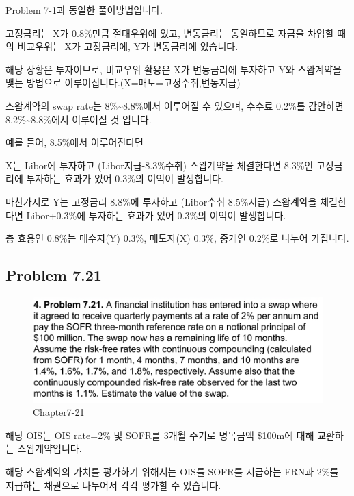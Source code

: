 \documentclass[
  letterpaper,
  DIV=11,
  numbers=noendperiod]{scrreprt}
\begin{document}
Problem 7-1과 동일한 풀이방법입니다.

고정금리는 X가 0.8\%만큼 절대우위에 있고, 변동금리는 동일하므로 자금을
차입할 때의 비교우위는 X가 고정금리에, Y가 변동금리에 있습니다.

해당 상황은 투자이므로, 비교우위 활용은 X가 변동금리에 투자하고 Y와
스왑계약을 맺는 방법으로 이루어집니다.(X=매도=고정수취,변동지급)

스왑계약의 swap rate는 8\%\textasciitilde8.8\%에서 이루어질 수 있으며,
수수료 0.2\%를 감안하면 8.2\%\textasciitilde8.8\%에서 이루어질 것
입니다.

예를 들어, 8.5\%에서 이루어진다면

X는 Libor에 투자하고 (Libor지급-8.3\%수취) 스왑계약을 체결한다면 8.3\%인
고정금리에 투자하는 효과가 있어 0.3\%의 이익이 발생합니다.

마찬가지로 Y는 고정금리 8.8\%에 투자하고 (Libor수취-8.5\%지급)
스왑계약을 체결한다면 Libor+0.3\%에 투자하는 효과가 있어 0.3\%의 이익이
발생합니다.

총 효용인 0.8\%는 매수자(Y) 0.3\%, 매도자(X) 0.3\%, 중개인 0.2\%로
나누어 가집니다.

\subsection*{\texorpdfstring{\textbf{Problem
7.21}}{Problem 7.21}}\label{problem-7.21}

\begin{figure}[H]

{\centering \includegraphics{images/선물옵션_7-21.png}

}

\caption{Chapter7-21}

\end{figure}%

해당 OIS는 OIS rate=2\% 및 SOFR를 3개월 주기로 명목금액 \$100m에 대해
교환하는 스왑계약입니다.

해당 스왑계약의 가치를 평가하기 위해서는 OIS를 SOFR를 지급하는 FRN과
2\%를 지급하는 채권으로 나누어서 각각 평가할 수 있습니다.
\end{document}
